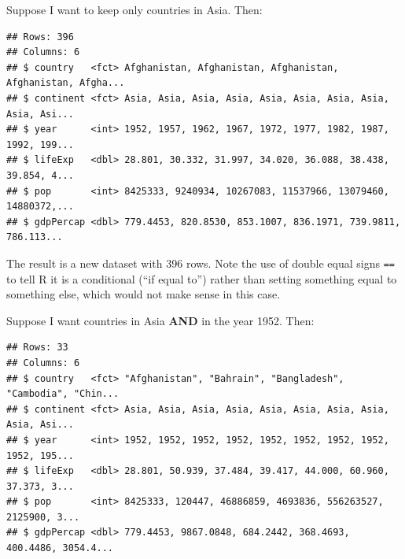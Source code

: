 \documentclass[
]{book}
\newenvironment{Shaded}{\begin{snugshade}}{\end{snugshade}}
\newcommand{\DecValTok}[1]{\textcolor[rgb]{0.00,0.00,0.81}{#1}}
\newcommand{\KeywordTok}[1]{\textcolor[rgb]{0.13,0.29,0.53}{\textbf{#1}}}
\newcommand{\NormalTok}[1]{#1}
\newcommand{\OperatorTok}[1]{\textcolor[rgb]{0.81,0.36,0.00}{\textbf{#1}}}
\newcommand{\StringTok}[1]{\textcolor[rgb]{0.31,0.60,0.02}{#1}}
\begin{document}
Suppose I want to keep only countries in Asia. Then:

\begin{Shaded}
\end{Shaded}

\begin{verbatim}
## Rows: 396
## Columns: 6
## $ country   <fct> Afghanistan, Afghanistan, Afghanistan, Afghanistan, Afgha...
## $ continent <fct> Asia, Asia, Asia, Asia, Asia, Asia, Asia, Asia, Asia, Asi...
## $ year      <int> 1952, 1957, 1962, 1967, 1972, 1977, 1982, 1987, 1992, 199...
## $ lifeExp   <dbl> 28.801, 30.332, 31.997, 34.020, 36.088, 38.438, 39.854, 4...
## $ pop       <int> 8425333, 9240934, 10267083, 11537966, 13079460, 14880372,...
## $ gdpPercap <dbl> 779.4453, 820.8530, 853.1007, 836.1971, 739.9811, 786.113...
\end{verbatim}

The result is a new dataset with 396 rows. Note the use of double equal signs \texttt{==} to tell R it is a conditional (``if equal to'') rather than setting something equal to something else, which would not make sense in this case.

Suppose I want countries in Asia \textbf{AND} in the year 1952. Then:

\begin{Shaded}
\end{Shaded}

\begin{verbatim}
## Rows: 33
## Columns: 6
## $ country   <fct> "Afghanistan", "Bahrain", "Bangladesh", "Cambodia", "Chin...
## $ continent <fct> Asia, Asia, Asia, Asia, Asia, Asia, Asia, Asia, Asia, Asi...
## $ year      <int> 1952, 1952, 1952, 1952, 1952, 1952, 1952, 1952, 1952, 195...
## $ lifeExp   <dbl> 28.801, 50.939, 37.484, 39.417, 44.000, 60.960, 37.373, 3...
## $ pop       <int> 8425333, 120447, 46886859, 4693836, 556263527, 2125900, 3...
## $ gdpPercap <dbl> 779.4453, 9867.0848, 684.2442, 368.4693, 400.4486, 3054.4...
\end{verbatim}
\end{document}
